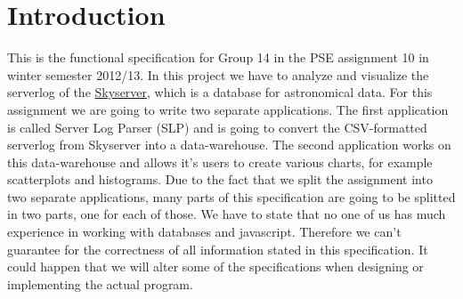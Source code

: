 \section{Introduction}
This is the functional specification for Group 14 in the PSE assignment 10 in winter semester 2012/13. 
In this project we have to analyze and visualize the serverlog of the 
\href{http://skyserver.sdss.org/public/en/}{Skyserver}, 
which is a database for astronomical data. For this assignment we are going to write 
two separate applications. The first application is called Server Log Parser (SLP)
and is going to convert the CSV-formatted serverlog from Skyserver into a data-warehouse.
The second application works on this data-warehouse and allows it's users to create various charts,
for example scatterplots and histograms. Due to the fact that we split the assignment
into two separate applications, many parts of this specification are going to be 
splitted in two parts, one for each of those. 
\newline
\newline
We have to state that no one of us has much experience in working with databases and javascript.
Therefore we can't guarantee for the correctness of all information stated in this specification.
It could happen that we will alter some of the specifications when designing or 
implementing the actual program.
